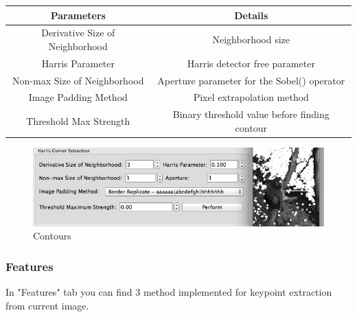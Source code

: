 \documentclass{article}
\begin{document}
\begin{table}[H]
\begin{center}
\begin{tabular}{|c|c|l|l|l|}
\hline
\textbf{Parameters}             & \multicolumn{4}{|c|}{\textbf{Details}}                              \\ \hline
Derivative Size of Neighborhood & \multicolumn{4}{|c|}{Neighborhood size}                             \\ \hline
Harris Parameter                & \multicolumn{4}{|c|}{Harris detector free parameter}                \\ \hline
Non-max Size of Neighborhood    & \multicolumn{4}{|c|}{Aperture parameter for the Sobel() operator}   \\ \hline
Image Padding Method            & \multicolumn{4}{|c|}{Pixel extrapolation method}                    \\ \hline
Threshold Max Strength          & \multicolumn{4}{|c|}{Binary threshold value before finding contour} \\ \hline
\end{tabular}
\end{center}
\end{table}

\begin{figure}[H]
\begin{center}
\includegraphics[scale=0.5]{toolboxHarris.png}
\caption{Contours}
\end{center}
\end{figure}	           

\subsubsection{Features}
In "Features" tab you can find 3 method implemented for keypoint extraction from current image.
\end{document}
